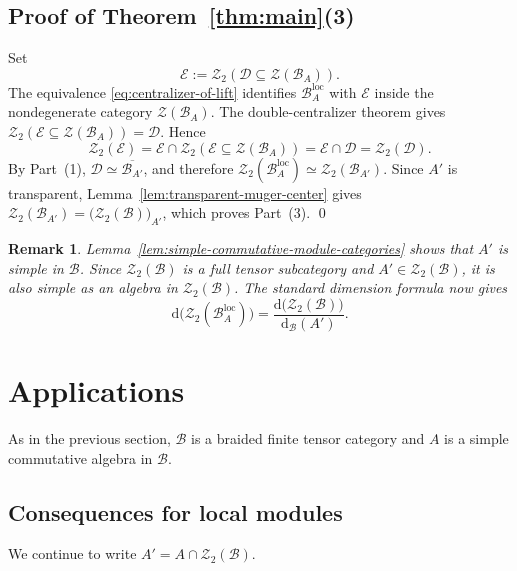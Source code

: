 \documentclass[10pt,a4paper]{amsart}
\numberwithin{equation}{section}
\newtheorem{remark}[thmctr]{Remark}
\newcommand{\B}{\mathcal{B}}
\newcommand{\D}{\mathcal{D}}
\newcommand{\E}{\mathcal{E}}
\newcommand{\Z}{\mathcal{Z}}
\newcommand{\loc}{\mathrm{loc}}
\newcommand{\FP}{\mathrm{d}}
\begin{document}
\subsection{Proof of Theorem~\ref{thm:main}(3)}
Set
\[
  \E:=\Z_2(\D\subseteq\Z(\B_A)).
\]
The equivalence \eqref{eq:centralizer-of-lift} identifies
$\B_A^{\loc}$ with $\E$ inside the nondegenerate category $\Z(\B_A)$.
The double-centralizer theorem \cite[Theorem~4.9]{shimizu2019non} gives 
$\Z_2(\E\subseteq\Z(\B_A))=\D$. 
Hence
\[
  \Z_2(\E) = \E\cap\Z_2(\E\subseteq\Z(\B_A)) = \E\cap\D = \Z_2(\D).
\]
By Part~(1), $\D\simeq\overline{\B_{A'}}$, and therefore
$\Z_2(\B_A^{\loc}) \simeq \Z_2(\B_{A'})$. 
Since $A'$ is transparent, Lemma~\ref{lem:transparent-muger-center} gives
$\Z_2(\B_{A'})=\bigl(\Z_2(\B)\bigr)_{A'}$, 
which proves Part~(3). \qed


\begin{remark}
Lemma~\ref{lem:simple-commutative-module-categories} shows that $A'$ is simple
in $\B$. Since $\Z_2(\B)$ is a full tensor subcategory and
$A'\in\Z_2(\B)$, it is also simple as an algebra in $\Z_2(\B)$. The standard
dimension formula \cite[Lemma~5.15]{shimizu2026commutative} now gives
\begin{equation}\label{eq:muger-center-local-module-fpdim}
  \FP\bigl(\Z_2(\B_A^{\loc})\bigr)
  =
  \frac{\FP\bigl(\Z_2(\B)\bigr)}{\FP_{\B}(A')}.
\end{equation}
\end{remark}




\section{Applications}
\label{sec:applications}
As in the previous section, $\B$ is a braided finite tensor category and $A$ is a simple commutative algebra in $\B$.


\subsection{Consequences for local modules}\label{sec:consequences}
We continue to write $A'=A\cap\Z_2(\B)$.
\end{document}
